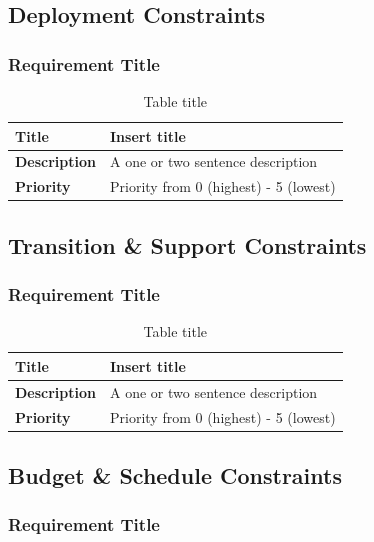\documentclass{article}
\begin{document}
\subsection{Deployment Constraints}

\subsubsection{Requirement Title}

\begin{table}[H]
\caption{Table title}
\begin{tabularx}{\textwidth}{|l|X|}
    \hline
    \textbf{Title} & Insert title \\ \hline
    \textbf{Description} &  A one or two sentence description \\ \hline 
    \textbf{Priority} &  Priority from 0 (highest) - 5 (lowest) \\ \hline       
\end{tabularx}
\end{table}

\subsection{Transition \& Support Constraints}

\subsubsection{Requirement Title}

\begin{table}[H]
\caption{Table title}
\begin{tabularx}{\textwidth}{|l|X|}
    \hline
    \textbf{Title} & Insert title \\ \hline
    \textbf{Description} &  A one or two sentence description \\ \hline 
    \textbf{Priority} &  Priority from 0 (highest) - 5 (lowest) \\ \hline       
\end{tabularx}
\end{table}

\subsection{Budget \& Schedule Constraints}

\subsubsection{Requirement Title}
\end{document}
